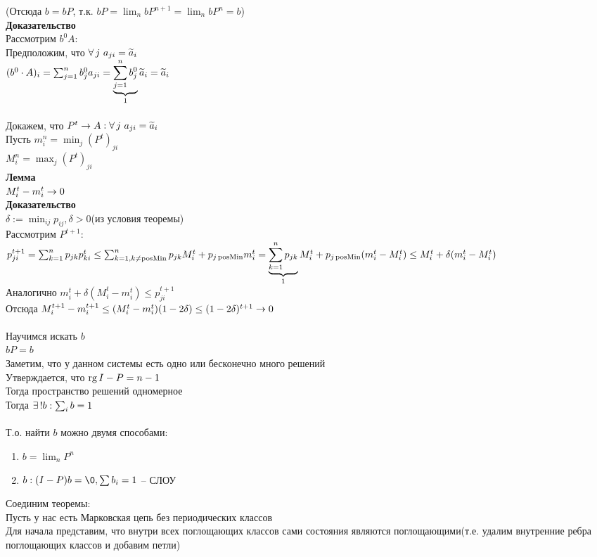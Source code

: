 \documentclass[12pt]{article}
\begin{document}
(Отсюда $b = bP$, т.к. $bP = \lim_n bP^{n+1} = \lim_n bP^n = b$)\\
\textbf{Доказательство}\\
Рассмотрим $b^0A$:\\
Предположим, что $\fall j\ a_{ji} = \ot a_i$\\
$(b^0\cdot A)_i = \sum_{j=1}^n b^0_j a_{ji} = \ub{1}{\sum_{j=1}^n b^0_j}\ot a_i = \ot a_i$\\\\
Докажем, что $P^t \rto A: \fall j\ a_{ji} = \ot a_i$\\
Пусть $m_i^n = \min_j (P^t)_{ji}$\\
$M^n_i = \max_j (P^t)_{ji}$\\
\textbf{Лемма}\\
$M^t_i -m^t_i \rto 0$\\
\textbf{Доказательство}\\
$\delta := \min_{ij}p_{ij}, \delta > 0$(из условия теоремы)\\
Рассмотрим $P^{t+1}$:\\
$p^{t+1}_{ji} = \sum_{k=1}^n p_{jk}p_{ki}^t \leq \sum_{k=1, k\neq \nm{posMin}}^n p_{jk}M_i^t + p_{j\nm{posMin}}m_i^t = \ub{1}{\sum_{k=1}^n p_{jk}}M_i^t + p_{j\nm{posMin}}(m_i^t-M_i^t) \leq M_i^t + \delta(m_i^t-M_i^t)$\\
Аналогично $m_i^t + \delta (M^t_i - m_i^t) \leq p_{ji}^{t+1}$\\
Отсюда $M^{t+1}_i - m^{t+1}_i \leq (M_i^t-m_i^t)(1-2\delta) \leq (1-2\delta)^{t+1} \rto 0$\\\\
Научимся искать $b$\\
$bP=b$\\
Заметим, что у данном системы есть одно или бесконечно много решений\\
Утверждается, что $\rg I-P = n-1$\\
Тогда пространство решений одномерное\\
Тогда $\ex! b: \sum_i b = 1$\\\\
Т.о. найти $b$ можно двумя способами:
\begin{enumerate}
    \item $b = \lim_n P^n$
    \item $b: (I-P)b = \0, \sum b_i = 1$ -- СЛОУ
\end{enumerate}
Соединим теоремы:\\
Пусть у нас есть Марковская цепь без периодических классов\\
Для начала представим, что внутри всех поглощающих классов сами состояния являются поглощающими(т.е. удалим внутренние ребра поглощающих классов и добавим петли)\\
\end{document}
